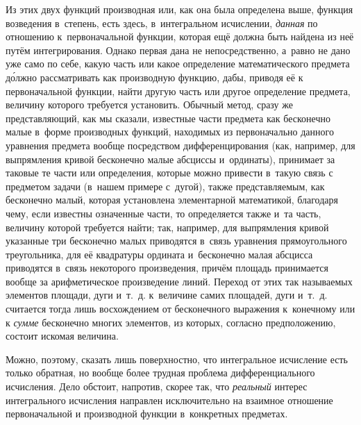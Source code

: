 Из этих двух функций производная или, как она была определена выше, функция
возведения в~степень, есть здесь, в~интегральном исчислении, {\em данная} по
отношению к~первоначальной функции, которая ещё должна быть найдена из неё
путём интегрирования. Однако первая дана не непосредственно, а~равно не дано
уже само по себе, какую часть или какое определение математического предмета
д\'{о}лжно рассматривать как производную функцию, дабы, приводя её
к первоначальной функции, найти другую часть или другое определение
предмета, величину которого требуется установить. Обычный
метод, сразу же представляющий, как мы сказали, известные части предмета как
бесконечно малые в~форме производных функций, находимых из первоначально
данного уравнения предмета вообще посредством дифференцирования (как, например,
для выпрямления кривой бесконечно малые абсциссы и~ординаты), принимает за
таковые те части или определения, которые можно привести в~такую связь с
предметом задачи (в~нашем примере с~дугой), также представляемым, как
бесконечно малый, которая установлена элементарной математикой, благодаря чему,
если известны означенные части, то определяется также и~та часть, величину
которой требуется найти; так, например, для выпрямления кривой указанные три
бесконечно малых приводятся в~связь уравнения прямоугольного треугольника, для
её квадратуры ордината и~бесконечно малая абсцисса приводятся в~связь
некоторого произведения, причём площадь принимается вообще за арифметическое
произведение линий. Переход от этих так называемых элементов площади, дуги
и~т.~д. к~величине самих площадей, дуги и~т.~д. считается тогда лишь
восхождением от бесконечного выражения к~конечному или к {\em сумме} бесконечно
многих элементов, из которых, согласно предположению, состоит искомая величина.

Можно, поэтому, сказать лишь поверхностно, что интегральное исчисление есть
только обратная, но вообще более трудная проблема дифференциального исчисления.
Дело обстоит, напротив, скорее так, что {\em реальный} интерес интегрального
исчисления направлен исключительно на взаимное отношение первоначальной и
производной функции в~конкретных предметах.


